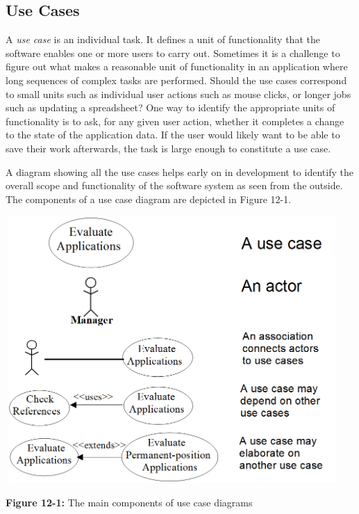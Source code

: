 \subsection{Use Cases}

A \textit{use case} is an individual task. It defines a
unit of functionality that the software enables one or more users to
carry out. Sometimes it is a challenge to figure out what makes a
reasonable {\textquotedbl}unit of functionality{\textquotedbl} in an
application where long sequences of complex tasks are performed. Should
the use cases correspond to small units such as individual user actions
such as mouse clicks, or longer jobs such as updating a spreadsheet?
One way to identify the appropriate units of functionality is to ask,
for any given user action, whether it completes a change to the state
of the application data. If the user would likely want to be able to
save their work afterwards, the task is large enough to constitute a
use case.

A diagram showing all the use cases helps early on in development to
identify the overall scope and functionality of the
software system as seen from the outside. The components of a use case
diagram are depicted in Figure 12-1.

\bigskip

\begin{center}
\includegraphics[width=5.0in,height=4in]{ub-img/usecase.png}

{\sffamily\bfseries Figure 12-1:}
{\sffamily The main components of use case diagrams}
\end{center}


